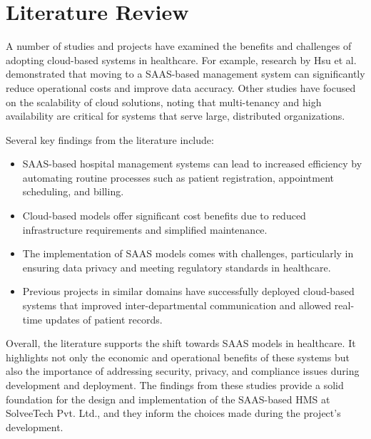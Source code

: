 \section{Literature Review}
A number of studies and projects have examined the benefits and challenges of adopting cloud-based systems in healthcare. For example, research by Hsu et al. demonstrated that moving to a SAAS-based management system can significantly reduce operational costs and improve data accuracy. Other studies have focused on the scalability of cloud solutions, noting that multi-tenancy and high availability are critical for systems that serve large, distributed organizations.

Several key findings from the literature include:
\begin{itemize}
  \item SAAS-based hospital management systems can lead to increased efficiency by automating routine processes such as patient registration, appointment scheduling, and billing.
  \item Cloud-based models offer significant cost benefits due to reduced infrastructure requirements and simplified maintenance.
  \item The implementation of SAAS models comes with challenges, particularly in ensuring data privacy and meeting regulatory standards in healthcare.
  \item Previous projects in similar domains have successfully deployed cloud-based systems that improved inter-departmental communication and allowed real-time updates of patient records.
\end{itemize}

Overall, the literature supports the shift towards SAAS models in healthcare. It highlights not only the economic and operational benefits of these systems but also the importance of addressing security, privacy, and compliance issues during development and deployment. The findings from these studies provide a solid foundation for the design and implementation of the SAAS-based HMS at SolveeTech Pvt. Ltd., and they inform the choices made during the project’s development.
